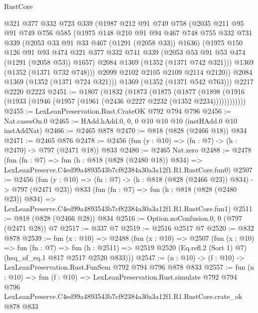 \begin{lexlean}{RustCore}
\begin{coremodule}
        @321
        @377
        @332
        @723
        @339
        (@1987
          @212
          @91
          @749
          @758
          (@2035
            @211
            @95
            @91
            @749
            @756
            @585
            (@1975
              @148
              @210
              @91
              @94
              @467
              @748
              @755
              @332
              @731
              @339
              (@2053 @33 @91 @33 @467 (@1291 (@2058 @33)) @1636)
              (@1975
                @150
                @126
                @91
                @93
                @474
                @321
                @377
                @332
                @741
                @339
                (@2053 @53 @91 @53 @474 (@1291 (@2058 @53)) @1657)
                @2084
                @1369
                (@1352 (@1371 @742 @321)))
              @1369
              (@1352 (@1371 @732 @748)))
            @2099
            @2102
            @2105
            @2109
            @2114
            @2120))
        @2084
        @1369
        (@1352 (@1371 @724 @321)))
      @1369
      (@1352 (@1371 @542 @763)))
    @2217
    @2220
    @2223
@2451 := @1807
    (@1832
      (@1873
        (@1875
          (@1877
            (@1898 (@1916 (@1933 (@1946 (@1957 (@1961 (@2436 @2227 @2232 (@1352 @2234))))))))))))
@2455 := LexLeanPreservation.Rust.CrateOK @792 @794 @796
@2456 := Nat.casesOn.{0}
@2465 := HAdd.hAdd.{0, 0, 0} @10 @10 @10 (instHAdd.{0} @10 instAddNat)
@2466 := @2465 @878
@2470 := @818 (@828 (@2466 @18)) @834
@2471 := @2465 @876
@2478 := @2456 (fun (y : @10) => (fn : @7) -> (h : @2470) -> @797 (@2471 @18)) @833
@2480 := @2465 Nat.zero
@2488 := @2478
    (fun (fn : @7) =>
    fun (h : @818 (@828 (@2480 @18)) @834) =>
    LexLeanPreserve.C4ed99a4893543b7cf82384a30a3a12f1.R1.RustCore.fun0)
@2507 := @2456
    (fun (y : @10) => (fn : @7) -> (h : @818 (@828 (@2466 @23)) @834) -> @797 (@2471 @23))
    @833
    (fun (fn : @7) =>
    fun (h : @818 (@828 (@2480 @23)) @834) =>
    LexLeanPreserve.C4ed99a4893543b7cf82384a30a3a12f1.R1.RustCore.fun1)
@2511 := @818 (@828 (@2466 @28)) @834
@2516 := Option.noConfusion.{0, 0} (@797 (@2471 @28)) @7
@2517 := @337 @7
@2519 := @2516 @2517 @7
@2520 := @832 @878
@2539 := fun (x : @10) =>
  @2488
    (fun (x : @10) =>
    @2507
      (fun (x : @10) =>
      fun (fn : @7) =>
      fun (h : @2511) =>
      @2519 @2520 (Eq.refl.{2} (Sort 1) @7) (heq_of_eq.{1} @817 @2517 @2520 @833)))
@2547 := (n : @10) -> (f : @10) -> LexLeanPreservation.Rust.FunSem @792 @794 @796 @878 @833
@2557 := fun (n : @10) =>
  fun (f : @10) =>
  LexLeanPreservation.Rust.simulate
    @792
    @794
    @796
    LexLeanPreserve.C4ed99a4893543b7cf82384a30a3a12f1.R1.RustCore.crate_ok
    @878
    @833
\end{coremodule}
\end{lexlean}
